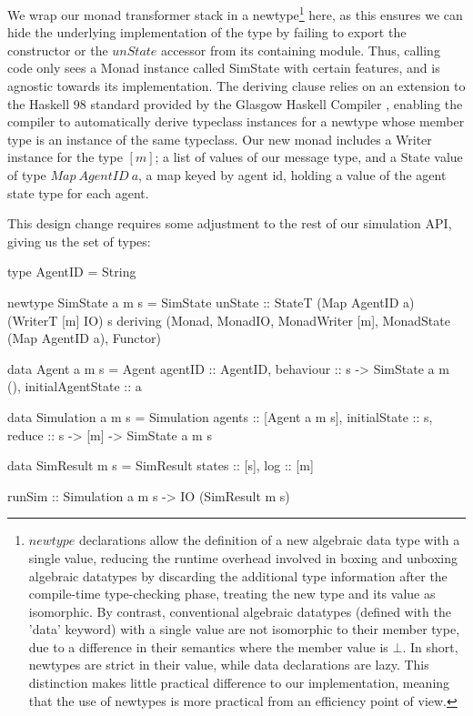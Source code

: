 \documentclass[a4paper, 11pt]{article}
\begin{document}
We wrap our monad transformer stack in a newtype\footnote{$newtype$ declarations allow the definition of a new algebraic data type with a single value, reducing the runtime overhead involved in boxing and unboxing algebraic datatypes by discarding the additional type information after the compile-time type-checking phase, treating the new type and its value as isomorphic. By contrast, conventional algebraic datatypes (defined with the 'data' keyword) with a single value are not isomorphic to their member type, due to a difference in their semantics where the member value is $\bot$. In short, newtypes are strict in their value, while data declarations are lazy. This distinction makes little practical difference to our implementation, meaning that the use of newtypes is more practical from an efficiency point of view.} here, as this ensures we can hide the underlying implementation of the type by failing to export the constructor or the $unState$ accessor from its containing module. Thus, calling code only sees a Monad instance called SimState with certain features, and is agnostic towards its implementation. The deriving clause relies on an extension to the Haskell 98 standard provided by the Glasgow Haskell Compiler \cite{Jones1992a}, enabling the compiler to automatically derive typeclass instances for a newtype whose member type is an instance of the same typeclass. Our new monad includes a Writer instance for the type $[m]$; a list of values of our message type, and a State value of type $Map\:AgentID\:a$, a map keyed by agent id, holding a value of the agent state type for each agent.

This design change requires some adjustment to the rest of our simulation API, giving us the set of types:


\begin{code}

  type AgentID = String

  newtype SimState a m s = SimState { unState :: StateT (Map AgentID a) (WriterT [m] IO) s } deriving (Monad, MonadIO, MonadWriter [m], MonadState (Map AgentID a), Functor)

  data Agent a m s = Agent {
    agentID :: AgentID,
    behaviour :: s -> SimState a m (),
    initialAgentState :: a
  }  

  data Simulation a m s = Simulation { agents :: [Agent a m s], 
    initialState :: s,
    reduce :: s -> [m] -> SimState a m s
  } 

  data SimResult m s = SimResult {states :: [s], log :: [m]}

  runSim :: Simulation a m s -> IO (SimResult m s) 
\end{code}
\end{document}
